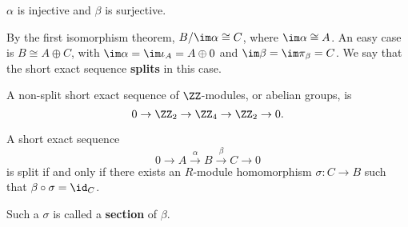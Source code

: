 \begin{note*}
$ \alpha $ is injective and $ \beta $ is surjective.
\end{note*}

\pagebreak

By the first isomorphism theorem, $ B / \im \alpha \cong C $, where $ \im \alpha \cong A $. An easy case is $ B \cong A \oplus C $, with $ \im \alpha = \im \iota_A = A \oplus 0 $ and $ \im \beta = \im \pi_\beta = C $. We say that the short exact sequence \textbf{splits} in this case.

\begin{example*}
A non-split short exact sequence of $ \ZZ $-modules, or abelian groups, is
$$ 0 \to \ZZ_2 \to \ZZ_4 \to \ZZ_2 \to 0. $$
\end{example*}

\begin{proposition}
A short exact sequence
$$ 0 \to A \xrightarrow{\alpha} B \xrightarrow{\beta} C \to 0 $$
is split if and only if there exists an $ R $-module homomorphism $ \sigma : C \to B $ such that $ \beta \circ \sigma = \id_C $.
\end{proposition}

Such a $ \sigma $ is called a \textbf{section} of $ \beta $.

